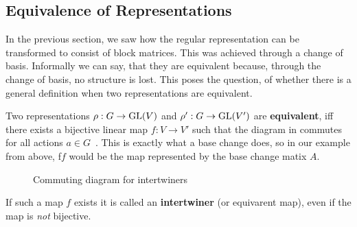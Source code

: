 \subsection{Equivalence of Representations}

In the previous section, we saw how the regular representation can be transformed to consist of block matrices.
This was achieved through a change of basis.
Informally we can say, that they are equivalent because, through the change of basis, no structure is lost.
This poses the question, of whether there is a general definition when two representations are equivalent.

Two representations $\rho: G \to \operatorname{GL}(V)$ and $\rho': G \to \operatorname{GL}(V')$ are \textbf{equivalent}, iff there exists a bijective linear map $f: V \to V'$ such that the diagram in  commutes for all actions $a \in G$~\cite{Hein2013}.
This is exactly what a base change does, so in our example from above, f$f$ would be the map represented by the base change matix $A$.
\begin{figure}[h]
    \centering
    \caption{Commuting diagram for intertwiners}
    \label{fig:main.what.equ-cd}
\end{figure}

If such a map $f$ exists it is called an \textbf{intertwiner} (or equivarent map), even if the map is \textit{not} bijective.
